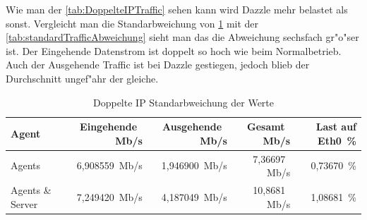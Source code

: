 Wie man der \cref{tab:DoppelteIPTraffic} sehen kann wird Dazzle mehr belastet als sonst. Vergleicht man die Standarbweichung %
von \cref{tab:DoppelteIPTrafficAbweichung} mit der \cref{tab:standardTrafficAbweichung} sieht man das %
die Abweichung sechsfach gr"o"ser ist. Der Eingehende Datenstrom ist doppelt so hoch wie beim Normalbetrieb. Auch der %
Ausgehende Traffic ist bei Dazzle gestiegen, jedoch blieb der Durchschnitt ungef"ahr der gleiche. %

\begin{table}
\centering
\begin{tabular}{l%
 r<{\,Mb/s}%
 r<{\,Mb/s}%
 r<{\,Mb/s}%
 r<{\,\%}%
}
Agent		& Eingehende            & Ausgehende            & Gesamt                & Last auf Eth0 \\
\hline
Agents		& 6,908559              & 1,946900              & 7,36697               &  0,73670        \\
Agents \& Server& 7,249420		& 4,187049        	& 10,8681             	&  1,08681         \\
\end{tabular}
\caption{Doppelte IP Standarbweichung der Werte}
\label{tab:DoppelteIPTrafficAbweichung}
\end{table}


